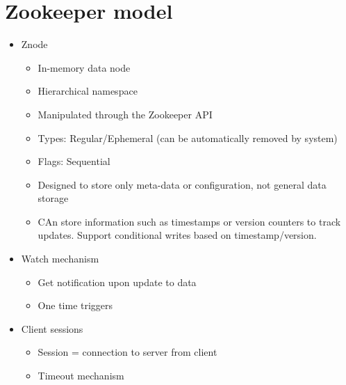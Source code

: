 \section{Zookeeper model}

\begin{itemize}
    \item Znode
    \begin{itemize}    
        \item In-memory data node
        \item Hierarchical namespace
        \item Manipulated through the Zookeeper API
        \item Types: Regular/Ephemeral (can be automatically removed by system)
        \item Flags: Sequential
        \item Designed to store only meta-data or configuration, not general data storage
        \item CAn store information such as timestamps or version counters to track updates. Support conditional writes based on timestamp/version.
    \end{itemize}
    
    \item Watch mechanism
    \begin{itemize}
        \item Get notification upon update to data
        \item One time triggers
    \end{itemize}
    
    \item Client sessions
    \begin{itemize}
        \item Session = connection to server from client
        \item Timeout mechanism
    \end{itemize}
\end{itemize}